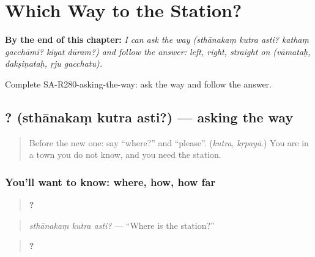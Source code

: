 
\chapter{Which Way to the Station?}
\label{ch:sa-which-way-to-the-station}

\begin{chapteropening}
\textbf{By the end of this chapter:} \emph{I can ask the way (sthānakaṃ kutra asti? kathaṃ gacchāmi? kiyat dūram?) and follow the answer: left, right, straight on (vāmataḥ, dakṣiṇataḥ, ṛju gacchatu).}

Complete SA-R280-asking-the-way: ask the way and follow the answer.
\end{chapteropening}

\section[\texorpdfstring{\sk{स्थानकं} \sk{कुत्र} \sk{अस्ति}? (sthānakaṃ kutra asti?)}{स्थानकं कुत्र अस्ति? (sthānakaṃ kutra asti?)}]{  ? (sthānakaṃ kutra asti?) — asking the way}

\label{lesson:SA-C280-sthanakam-kutra}



\begin{quote}
Before the new one: say \textquotedblleft{}where?\textquotedblright{} and \textquotedblleft{}please\textquotedblright{}. (\emph{kutra}, \emph{kṛpayā}.) You are in a town you do not know, and you need the station.
\end{quote}

\subsection*{You'll want to know: where, how, how far}
\begin{quote}
\textbf{  ?}
\end{quote}

\begin{quote}
\emph{sthānakaṃ kutra asti?} — \textquotedblleft{}Where is the station?\textquotedblright{}
\end{quote}

\begin{quote}
\textbf{  ?}
\end{quote}

